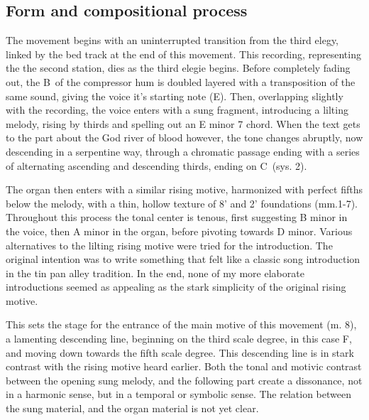 \documentclass[12pt,twoside,maitrise]{dms_ks}
\theoremstyle{definition}
\begin{document}
{\subsection{Form and compositional process}

The movement begins with an uninterrupted transition from the third elegy, linked by the bed track at the end of this movement. 
This recording, representing the the second station, dies as the third elegie begins. 
Before completely fading out, the B\na\ of the compressor hum is doubled layered with a transposition of the same sound, giving the voice it's starting note (E\na). 
Then, overlapping slightly with the recording, the voice enters with a sung fragment, introducing a lilting melody, rising by thirds and spelling out an E minor 7 chord. 
When the text gets to the part about the God river of blood however, the tone changes abruptly, now descending in a serpentine way, through a chromatic passage ending with a series of alternating ascending and descending thirds, ending on C\na\ (sys. 2).


The organ then enters with a similar rising motive, harmonized with perfect fifths below the melody, with a thin, hollow texture of 8' and 2' foundations (mm.1-7).
Throughout this process the tonal center is tenous, first suggesting B minor in the voice, then A minor in the organ, before pivoting towards D minor.  
Various alternatives to the lilting rising motive were tried for the introduction.  
The original intention was to write something that felt like a classic song introduction in the tin pan alley tradition.  
In the end, none of my more elaborate introductions seemed as appealing as the stark simplicity of the original rising motive.

This sets the stage for the entrance of the main motive of this movement (m. 8), a lamenting descending line, beginning on the third scale degree, in this case F, and moving down towards the fifth scale degree.  
This descending line is in stark contrast with the rising motive heard earlier.  
Both the tonal and motivic contrast between the opening sung melody, and the following part create a dissonance, not in a harmonic sense, but in a temporal or symbolic sense.  
The relation between the sung material, and the organ material is not yet clear.  

}
\end{document}
